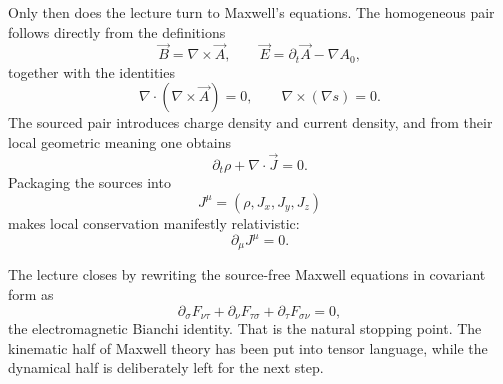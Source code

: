 Only then does the lecture turn to Maxwell's equations. The homogeneous pair follows directly from the definitions
\begin{equation}
\vec B=\nabla\times\vec A,
\qquad
\vec E=\partial_t\vec A-\nabla A_0,
\end{equation}
together with the identities
\begin{equation}
\nabla\cdot(\nabla\times\vec A)=0,
\qquad
\nabla\times(\nabla s)=0.
\end{equation}
The sourced pair introduces charge density and current density, and from their local geometric meaning one obtains
\begin{equation}
\partial_t\rho+\nabla\cdot\vec J=0.
\end{equation}
Packaging the sources into
\begin{equation}
J^\mu=(\rho,J_x,J_y,J_z)
\end{equation}
makes local conservation manifestly relativistic:
\begin{equation}
\partial_\mu J^\mu=0.
\end{equation}

The lecture closes by rewriting the source-free Maxwell equations in covariant form as
\begin{equation}
\partial_\sigma F_{\nu\tau}
+\partial_\nu F_{\tau\sigma}
+\partial_\tau F_{\sigma\nu}
=0,
\end{equation}
the electromagnetic Bianchi identity. That is the natural stopping point. The kinematic half of Maxwell theory has been put into tensor language, while the dynamical half is deliberately left for the next step.